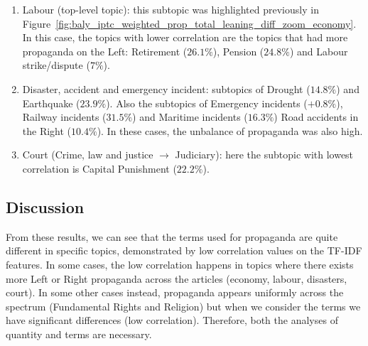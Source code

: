 \begin{enumerate}
    \item Labour (top-level topic): this subtopic was highlighted previously in Figure~\ref{fig:baly_iptc_weighted_prop_total_leaning_diff_zoom_economy}. In this case, the topics with lower correlation are the topics that had more propaganda on the Left:  Retirement ($26.1\%$), Pension ($24.8\%$) and Labour strike/dispute ($7\%$).
    \item Disaster, accident and emergency incident: subtopics of Drought ($14.8\%$) and Earthquake ($23.9\%$). Also the subtopics of Emergency incidents ($+0.8\%$), Railway incidents ($31.5\%$) and Maritime incidents ($16.3\%$) Road accidents in the Right ($10.4\%$). In these cases, the unbalance of propaganda was also high.
    \item Court (Crime, law and justice $\rightarrow$ Judiciary): here the subtopic with lowest correlation is Capital Punishment ($22.2\%$).
\end{enumerate}

\subsection{\statusgreen Discussion}

From these results, we can see that the terms used for propaganda are quite different in specific topics, demonstrated by low correlation values on the TF-IDF features.
In some cases, the low correlation happens in topics where there exists more Left or Right propaganda across the articles (economy, labour, disasters, court). In some other cases instead, propaganda appears uniformly across the spectrum (Fundamental Rights and Religion) but when we consider the terms we have significant differences (low correlation). Therefore, both the analyses of quantity and terms are necessary.






